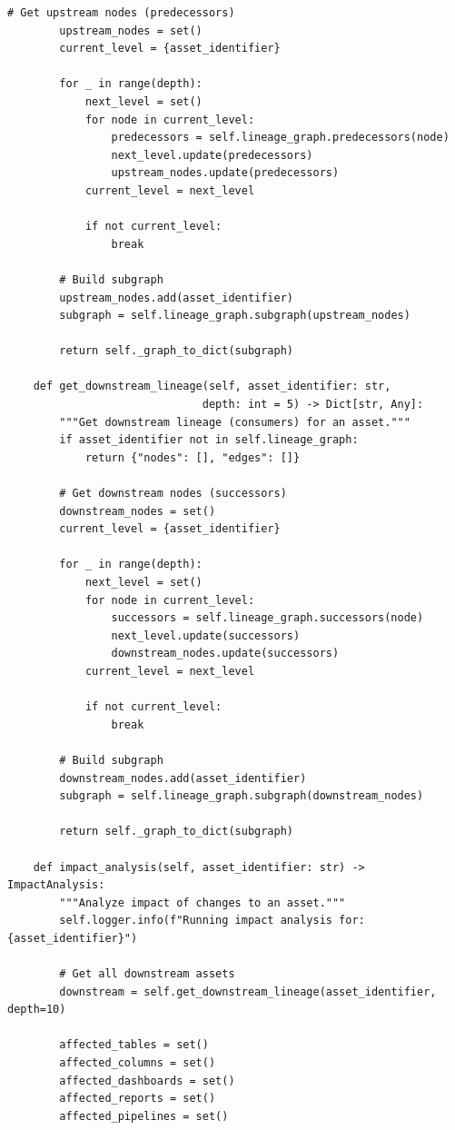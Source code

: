 \begin{lstlisting}[style=python, caption=LineageTracker with Column-Level Dependencies]
        # Get upstream nodes (predecessors)
        upstream_nodes = set()
        current_level = {asset_identifier}

        for _ in range(depth):
            next_level = set()
            for node in current_level:
                predecessors = self.lineage_graph.predecessors(node)
                next_level.update(predecessors)
                upstream_nodes.update(predecessors)
            current_level = next_level

            if not current_level:
                break

        # Build subgraph
        upstream_nodes.add(asset_identifier)
        subgraph = self.lineage_graph.subgraph(upstream_nodes)

        return self._graph_to_dict(subgraph)

    def get_downstream_lineage(self, asset_identifier: str,
                              depth: int = 5) -> Dict[str, Any]:
        """Get downstream lineage (consumers) for an asset."""
        if asset_identifier not in self.lineage_graph:
            return {"nodes": [], "edges": []}

        # Get downstream nodes (successors)
        downstream_nodes = set()
        current_level = {asset_identifier}

        for _ in range(depth):
            next_level = set()
            for node in current_level:
                successors = self.lineage_graph.successors(node)
                next_level.update(successors)
                downstream_nodes.update(successors)
            current_level = next_level

            if not current_level:
                break

        # Build subgraph
        downstream_nodes.add(asset_identifier)
        subgraph = self.lineage_graph.subgraph(downstream_nodes)

        return self._graph_to_dict(subgraph)

    def impact_analysis(self, asset_identifier: str) -> ImpactAnalysis:
        """Analyze impact of changes to an asset."""
        self.logger.info(f"Running impact analysis for: {asset_identifier}")

        # Get all downstream assets
        downstream = self.get_downstream_lineage(asset_identifier, depth=10)

        affected_tables = set()
        affected_columns = set()
        affected_dashboards = set()
        affected_reports = set()
        affected_pipelines = set()


\end{lstlisting}

